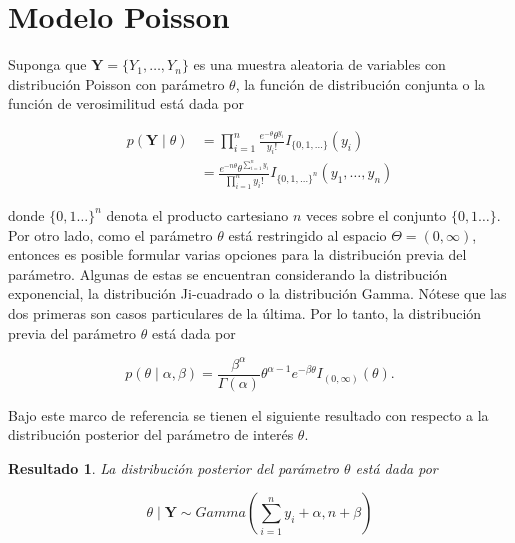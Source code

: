 \documentclass[
  12pt,
  spanish,
]{book}
\newtheorem{proposition}{Resultado}[chapter]
\theoremstyle{definition}
\theoremstyle{definition}
\theoremstyle{definition}
\theoremstyle{definition}
\theoremstyle{remark}
\begin{document}
\hypertarget{modelo-poisson}{%
\section{Modelo Poisson}\label{modelo-poisson}}

Suponga que \(\mathbf{Y}=\{Y_1,\ldots,Y_n\}\) es una muestra aleatoria de variables con distribución Poisson con parámetro \(\theta\), la función de distribución conjunta o la función de verosimilitud está dada por

\begin{align*}
p(\mathbf{Y} \mid \theta)&=\prod_{i=1}^n\frac{e^{-\theta}\theta^{y_i}}{y_i!}I_{\{0,1,\ldots\}}(y_i)\\
&=\frac{e^{-n\theta}\theta^{\sum_{i=1}^ny_i}}{\prod_{i=1}^ny_i!}I_{\{0,1,\ldots\}^n}(y_1,\ldots,y_n)
\end{align*}

donde \(\{0,1\ldots\}^n\) denota el producto cartesiano \(n\) veces sobre el conjunto \(\{0,1\ldots\}\). Por otro lado, como el parámetro \(\theta\) está restringido al espacio \(\Theta=(0,\infty)\), entonces es posible formular varias opciones para la distribución previa del parámetro. Algunas de estas se encuentran considerando la distribución exponencial, la distribución Ji-cuadrado o la distribución Gamma. Nótese que las dos primeras son casos particulares de la última. Por lo tanto, la distribución previa del parámetro \(\theta\) está dada por

\begin{equation}
p(\theta \mid \alpha,\beta)=\frac{\beta^\alpha}{\Gamma(\alpha)}\theta^{\alpha-1} e^{-\beta\theta}I_{(0,\infty)}(\theta).
\end{equation}

Bajo este marco de referencia se tienen el siguiente resultado con respecto a la distribución posterior del parámetro de interés \(\theta\).

\begin{proposition}
\protect\hypertarget{prp:ResPoissonPost}{}{\label{prp:ResPoissonPost} }La distribución posterior del parámetro \(\theta\) está dada por

\begin{equation*}
\theta \mid \mathbf{Y} \sim Gamma\left(\sum_{i=1}^ny_i+\alpha,n+\beta\right)
\end{equation*}
\end{proposition}
\end{document}
